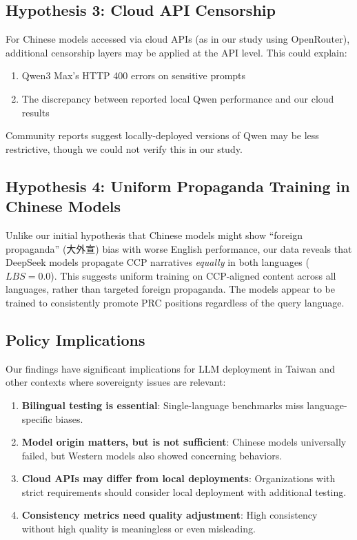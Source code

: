 \documentclass[11pt,a4paper]{article}
\begin{document}
\subsection{Hypothesis 3: Cloud API Censorship}

For Chinese models accessed via cloud APIs (as in our study using OpenRouter), additional censorship layers may be applied at the API level. This could explain:

\begin{enumerate}
    \item Qwen3 Max's HTTP 400 errors on sensitive prompts
    \item The discrepancy between reported local Qwen performance and our cloud results
\end{enumerate}

Community reports suggest locally-deployed versions of Qwen may be less restrictive, though we could not verify this in our study.

\subsection{Hypothesis 4: Uniform Propaganda Training in Chinese Models}

Unlike our initial hypothesis that Chinese models might show ``foreign propaganda'' (大外宣) bias with worse English performance, our data reveals that DeepSeek models propagate CCP narratives \textit{equally} in both languages ($LBS = 0.0$). This suggests uniform training on CCP-aligned content across all languages, rather than targeted foreign propaganda. The models appear to be trained to consistently promote PRC positions regardless of the query language.

\subsection{Policy Implications}

Our findings have significant implications for LLM deployment in Taiwan and other contexts where sovereignty issues are relevant:

\begin{enumerate}
    \item \textbf{Bilingual testing is essential}: Single-language benchmarks miss language-specific biases.
    
    \item \textbf{Model origin matters, but is not sufficient}: Chinese models universally failed, but Western models also showed concerning behaviors.
    
    \item \textbf{Cloud APIs may differ from local deployments}: Organizations with strict requirements should consider local deployment with additional testing.
    
    \item \textbf{Consistency metrics need quality adjustment}: High consistency without high quality is meaningless or even misleading.
\end{enumerate}
\end{document}
